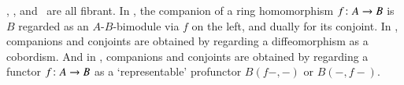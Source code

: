 
\begin{egs}
  \lMod, \lnCob, and \lProf\ are all fibrant.  In \lMod, the companion
  of a ring homomorphism $f\colon A\to B$ is $B$ regarded as an
  $A$-$B$-bimodule via $f$ on the left, and dually for its conjoint.
  In \lnCob, companions and conjoints are obtained by regarding a
  diffeomorphism as a cobordism.  And in \lProf, companions and
  conjoints are obtained by regarding a functor $f\colon A\to B$ as a
  `representable' profunctor $B(f-,-)$ or $B(-,f-)$.
\end{egs}

